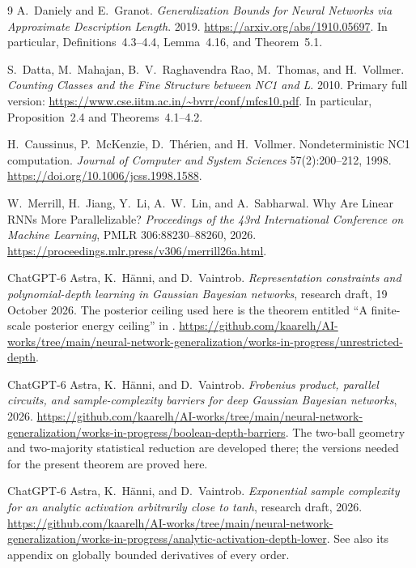 \documentclass[11pt]{article}
\theoremstyle{remark}\newtheorem{remark}[theorem]{Remark}
\begin{document}
\begin{thebibliography}{9}
A.~Daniely and E.~Granot.
\emph{Generalization Bounds for Neural Networks via Approximate
Description Length}. 2019.
\url{https://arxiv.org/abs/1910.05697}.
In particular, Definitions~4.3--4.4, Lemma~4.16, and Theorem~5.1.

S.~Datta, M.~Mahajan, B.~V.~Raghavendra Rao, M.~Thomas, and H.~Vollmer.
\emph{Counting Classes and the Fine Structure between NC1 and L}.
2010. Primary full version:
\url{https://www.cse.iitm.ac.in/~bvrr/conf/mfcs10.pdf}.
In particular, Proposition~2.4 and Theorems~4.1--4.2.

H.~Caussinus, P.~McKenzie, D.~Th\'erien, and H.~Vollmer.
Nondeterministic NC1 computation.
\emph{Journal of Computer and System Sciences} 57(2):200--212, 1998.
\url{https://doi.org/10.1006/jcss.1998.1588}.

W.~Merrill, H.~Jiang, Y.~Li, A.~W.~Lin, and A.~Sabharwal.
Why Are Linear RNNs More Parallelizable?
\emph{Proceedings of the 43rd International Conference on Machine Learning},
PMLR 306:88230--88260, 2026.
\url{https://proceedings.mlr.press/v306/merrill26a.html}.

ChatGPT-6 Astra, K.~H\"anni, and D.~Vaintrob.
\emph{Representation constraints and polynomial-depth learning
in Gaussian Bayesian networks}, research draft, 19 October 2026.
The posterior ceiling used here is the theorem entitled
``A finite-scale posterior energy ceiling'' in
.
\url{https://github.com/kaarelh/AI-works/tree/main/neural-network-generalization/works-in-progress/unrestricted-depth}.

ChatGPT-6 Astra, K.~H\"anni, and D.~Vaintrob.
\emph{Frobenius product, parallel circuits, and sample-complexity barriers
for deep Gaussian Bayesian networks}, 2026.
\url{https://github.com/kaarelh/AI-works/tree/main/neural-network-generalization/works-in-progress/boolean-depth-barriers}.
The two-ball geometry and two-majority statistical reduction are developed
there; the versions needed for the present theorem are proved here.

ChatGPT-6 Astra, K.~H\"anni, and D.~Vaintrob.
\emph{Exponential sample complexity for an analytic activation
arbitrarily close to tanh}, research draft, 2026.
\url{https://github.com/kaarelh/AI-works/tree/main/neural-network-generalization/works-in-progress/analytic-activation-depth-lower}.
See also its appendix on globally bounded derivatives of every order.
\end{thebibliography}
\end{document}
